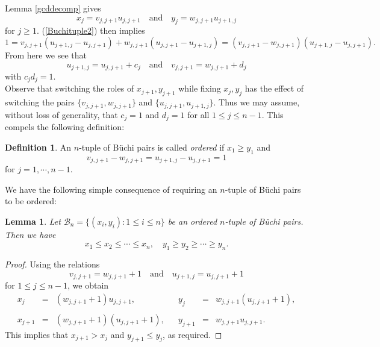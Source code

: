 \documentclass[letterpaper,10pt]{amsart}
\newcommand{\B}{{\mathcal{B}}}
\newtheorem{lemma}[theorem]{Lemma}
\theoremstyle{definition}
\newtheorem{definition}[theorem]{Definition}
\numberwithin{equation}{section}
\begin{document}
	Lemma \ref{gcddecomp} gives
	\[x_j = v_{j,j+1} u_{j,j+1} \quad \text{and} \quad y_j = w_{j,j+1} u_{j+1,j}\]
	for $j \geq 1$. (\ref{Buchituple2}) then implies
	\begin{equation} \label{spliteq}  1 = v_{j,j+1}(u_{j+1,j} - u_{j,j+1}) + w_{j,j+1}(u_{j,j+1} - u_{j+1,j}) = (v_{j,j+1} - w_{j,j+1})(u_{j+1,j} - u_{j,j+1}).\end{equation}
	From here we see that 
	\begin{equation} \label{wusub} u_{j+1,j} = u_{j,j+1} + c_j \quad \text{and} \quad v_{j,j+1} = w_{j,j+1} + d_j
	\end{equation}
	with $c_j d_j = 1$. \\

	
	Observe that switching the roles of $x_{j+1}, y_{j+1}$ while fixing $x_j, y_j$ has the effect of switching the pairs $\{v_{j,j+1}, w_{j,j+1}\}$ and $\{u_{j,j+1}, u_{j+1,j}\}$. Thus we may assume, without loss of generality, that $c_j = 1$ and $d_j = 1$ for all $1 \leq j \leq n-1$. This compels the following definition:
	
	\begin{definition} \label{ordered} An $n$-tuple of B\"{u}chi pairs is called \emph{ordered} if $x_1 \geq y_1$ and 
	\[v_{j, j+1} - w_{j,j+1} = u_{j+1, j} - u_{j,j+1} = 1\]
	for $j = 1, \cdots, n-1$. 
	\end{definition}
	
We have the following simple consequence of requiring an $n$-tuple of B\"{u}chi pairs to be ordered:

\begin{lemma} \label{ordlem1} Let $\B_n = \{(x_i, y_i) : 1 \leq i \leq n\}$ be an ordered $n$-tuple of B\"{u}chi pairs. Then we have 
\[x_1 \leq x_2 \leq \cdots \leq x_n, \quad y_1 \geq y_2 \geq \cdots \geq y_n.\]
\end{lemma}

\begin{proof} Using the relations 
\[v_{j,j+1} = w_{j,j+1} + 1 \quad \text{and} \quad u_{j+1,j} = u_{j,j+1} + 1\]
for $1 \leq j \leq n-1$, we obtain
\[\begin{matrix} x_j &  = & (w_{j,j+1} + 1)u_{j,j+1}, & & y_j & = & w_{j,j+1}(u_{j,j+1} + 1),  \\ \\ 
x_{j+1} & = & (w_{j,j+1} + 1)(u_{j,j+1} + 1), & & y_{j+1} & = & w_{j,j+1} u_{j,j+1}.
\end{matrix}\]
This implies that $x_{j+1} > x_j$ and $y_{j+1} \leq y_j$, as required. \end{proof}
	
\end{document}
